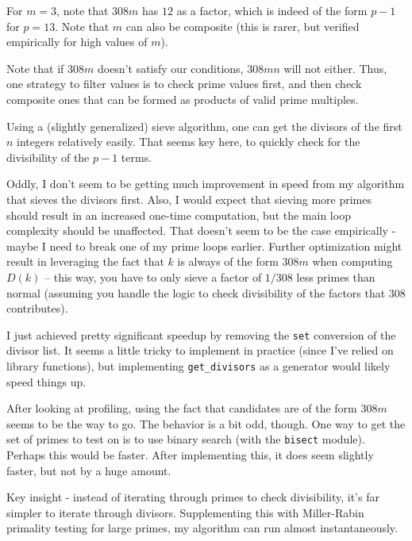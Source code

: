 \documentclass{article}
\begin{document}
For $m = 3$, note that $308m$ has $12$ as a factor, which is indeed of the form $p-1$ for $p = 13$.  Note that $m$ can also be composite (this is rarer, but verified empirically for high values of $m$).

Note that if $308m$ doesn't satisfy our conditions, $308mn$ will not either.  Thus, one strategy to filter values is to check prime values first, and then check composite ones that can be formed as products of valid prime multiples.

Using a (slightly generalized) sieve algorithm, one can get the divisors of the first $n$ integers relatively easily.  That seems key here, to quickly check for the divisibility of the $p-1$ terms.

Oddly, I don't seem to be getting much improvement in speed from my algorithm that sieves the divisors first.  Also, I would expect that sieving more primes should result in an increased one-time computation, but the main loop complexity should be unaffected.  That doesn't seem to be the case empirically - maybe I need to break one of my prime loops earlier.  Further optimization might result in leveraging the fact that $k$ is always of the form $308m$ when computing $D(k)$ -- this way, you have to only sieve a factor of $1/308$ less primes than normal (assuming you handle the logic to check divisibility of the factors that 308 contributes).

I just achieved pretty significant speedup by removing the \texttt{set} conversion of the divisor list.  It seems a little tricky to implement in practice (since I've relied on library functions), but implementing \texttt{get\_divisors} as a generator would likely speed things up.

After looking at profiling, using the fact that candidates are of the form $308m$ seems to be the way to go.  The behavior is a bit odd, though.  One way to get the set of primes to test on is to use binary search (with the \texttt{bisect} module).  Perhaps this would be faster.  After implementing this, it does seem slightly faster, but not by a huge amount.

Key insight - instead of iterating through primes to check divisibility, it's far simpler to iterate through divisors.  Supplementing this with Miller-Rabin primality testing for large primes, my algorithm can run almost instantaneously.
\end{document}
